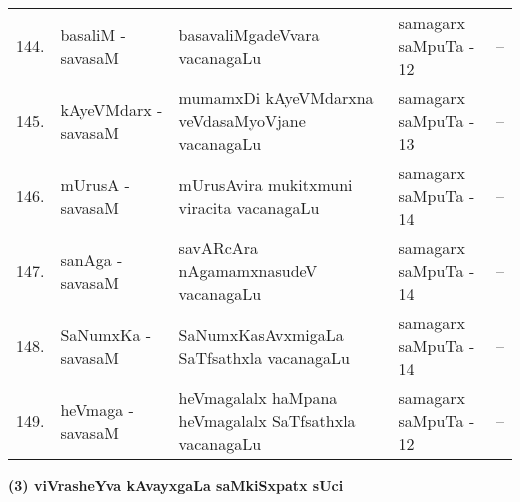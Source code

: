 {\begin{longtable}{rl>{\raggedright}p{5.5cm}lc}
144. & basaliM - savasaM & basavaliMgadeVvara vacanagaLu & samagarx saMpuTa - 12 & --\\
145. & kAyeVMdarx - savasaM & mumamxDi kAyeVMdarxna\newline \phantom{AA} veVdasaMyoVjane vacanagaLu & samagarx saMpuTa - 13 & --\\
146. & mUrusA - savasaM & mUrusAvira mukitxmuni viracita vacanagaLu & samagarx saMpuTa - 14 & --\\
147. & sanAga - savasaM &  savARcAra nAgamamxnasudeV vacanagaLu & samagarx saMpuTa - 14 & --\\
148. & SaNumxKa - savasaM & SaNumxKasAvxmigaLa SaTfsathxla vacanagaLu & samagarx saMpuTa - 14 & --\\
149. & heVmaga - savasaM & heVmagalalx haMpana heVmagalalx\newline \phantom{AA} SaTfsathxla vacanagaLu & samagarx saMpuTa - 12 & --\\
\end{longtable}}

\newpage

\begin{center}
{\large\bf (3) viVrasheYva kAvayxgaLa saMkiSxpatx sUci}
\end{center}


